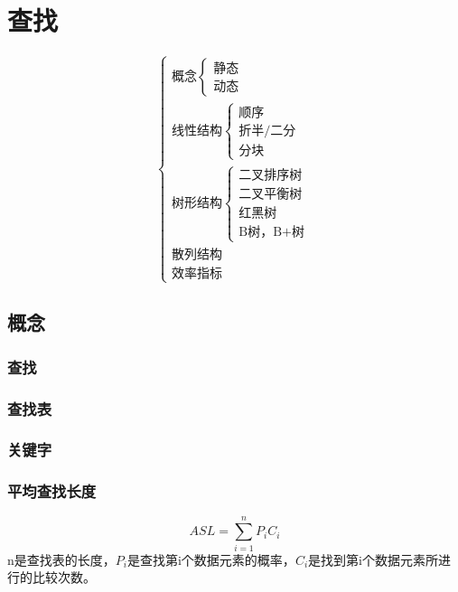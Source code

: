 
\chapter{查找}

\[\begin{cases}
    \text{概念}\begin{cases}
        \text{静态} \\ 
        \text{动态}
    \end{cases} \\ 
    \text{线性结构}\begin{cases}
        \text{顺序} \\ 
        \text{折半/二分} \\ 
        \text{分块}
    \end{cases} \\ 
    \text{树形结构}\begin{cases}
        \text{二叉排序树} \\ 
        \text{二叉平衡树} \\ 
        \text{红黑树} \\ 
        \text{B树，B+树}
    \end{cases} \\ 
    \text{散列结构} \\ 
    \text{效率指标}
\end{cases}\]


\section{概念}

\subsection{查找}


\subsection{查找表}


\subsection{关键字}


\subsection{平均查找长度}
\[ASL = \sum_{i = 1}^nP_iC_i\]
n是查找表的长度，\(P_i\)是查找第i个数据元素的概率，\(C_i\)是找到第i个数据元素所进行的比较次数。


